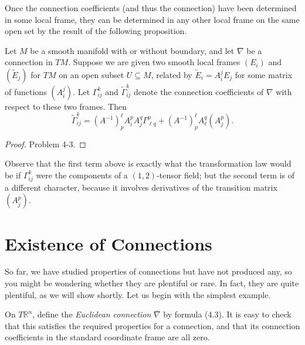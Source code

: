 Once the connection coefficients (and thus the connection) have been determined in some local frame, they can be determined in any other local frame on the same open set by the result of the following proposition.

\begin{proposition}
\label{prop:transformation-law-connection-coefficients}
Let $M$ be a smooth manifold with or without boundary, and let $\nabla$ be a connection in $TM$. Suppose we are given two smooth local frames $(E_i)$ and $(\tilde{E}_j)$ for $TM$ on an open subset $U \subseteq M$, related by $\tilde{E}_i = A^j_i E_j$ for some matrix of functions $(A^j_i)$. Let $\Gamma^k_{ij}$ and $\tilde{\Gamma}^k_{ij}$ denote the connection coefficients of $\nabla$ with respect to these two frames. Then
\[
\tilde{\Gamma}^k_{ij} = (A^{-1})^\ell_p A^p_i A^q_j \Gamma^p_{\ell q} + (A^{-1})^\ell_p A^q_\ell (A^p_j).
\]
\end{proposition}

\begin{proof}
Problem 4-3.
\end{proof}

Observe that the first term above is exactly what the transformation law would be if $\Gamma^k_{ij}$ were the components of a $(1,2)$-tensor field; but the second term is of a different character, because it involves derivatives of the transition matrix $(A^p_j)$.

\section{Existence of Connections}

So far, we have studied properties of connections but have not produced any, so you might be wondering whether they are plentiful or rare. In fact, they are quite plentiful, as we will show shortly. Let us begin with the simplest example.

\begin{example}
\label{ex:euclidean-connection}
On $T\mathbb{R}^n$, define the \emph{Euclidean connection} $\bar\nabla$ by formula (4.3). It is easy to check that this satisfies the required properties for a connection, and that its connection coefficients in the standard coordinate frame are all zero.
\end{example}

